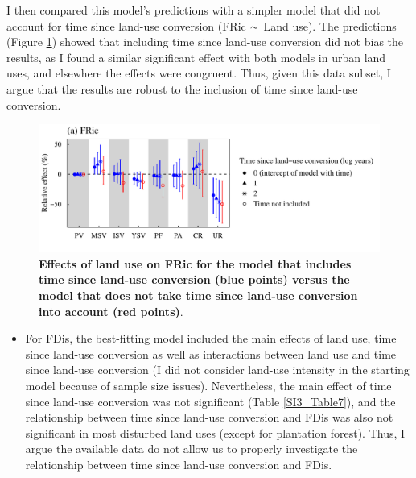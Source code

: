 I then compared this model’s predictions with a simpler model that did not account for time since land-use conversion (FRic  $\thicksim$ Land use). The predictions (Figure \ref{SI3_F25}) showed that including time since land-use conversion did not bias the results, as I found a similar significant effect with both models in urban land uses, and elsewhere the effects were congruent. Thus, given this data subset, I argue that the results are robust to the inclusion of time since land-use conversion.

\begin{figure}[h!]
\centering
\includegraphics[scale=0.7]{Supporting/Chapter3/Figures/SI_time_since_conv_FRic}
\caption[Effects of land use on FRic for the model that includes time since land-use conversion (blue points) versus the model that does not take time since land-use conversion into account (red points)]{\textbf{Effects of land use on FRic for the model that includes time since land-use conversion (blue points) versus the model that does not take time since land-use conversion into account (red points)}.}
\label{SI3_F25}
\end{figure}

\begin{itemize}
\item For FDis, the best-fitting model included the main effects of land use, time since land-use conversion as well as interactions between land use and time since land-use conversion (I did not consider land-use intensity in the starting model because of sample size issues). Nevertheless, the main effect of time since land-use conversion was not significant (Table \ref{SI3_Table7}), and the relationship between time since land-use conversion and FDis was also not significant in most disturbed land uses (except for plantation forest). Thus, I argue the available data do not allow us to properly investigate the relationship between time since land-use conversion and FDis.
\end{itemize}

